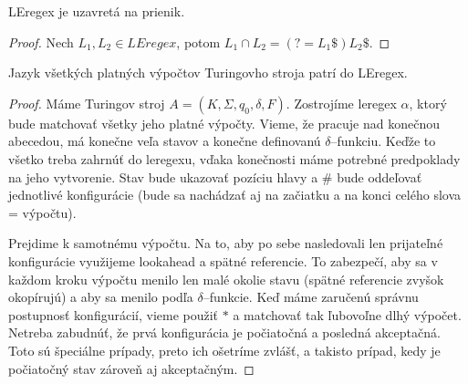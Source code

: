 \begin{veta}
LEregex je uzavretá na prienik.
\end{veta}
\begin{proof}
Nech $L_1,L_2 \in LEregex$, potom $L_1 \cap L_2 = \left( ?= L_1 \mathdollar \right) L_2 \mathdollar $.
\end{proof}

\begin{veta}
Jazyk všetkých platných výpočtov Turingovho stroja patrí do LEregex.
\end{veta}
\begin{proof}
Máme Turingov stroj $A = (K,\Sigma ,q_0,\delta ,F)$. Zostrojíme leregex $\alpha$, ktorý bude matchovať všetky jeho platné výpočty. Vieme, že pracuje nad konečnou abecedou, má konečne veľa stavov a konečne definovanú $\delta$--funkciu. Keďže to všetko treba zahrnúť do leregexu, vďaka konečnosti máme potrebné predpoklady na jeho vytvorenie. Stav bude ukazovať pozíciu hlavy a $\#$ bude oddeľovať jednotlivé konfigurácie (bude sa nachádzať aj na začiatku a na konci celého slova = výpočtu).

Prejdime k samotnému výpočtu. Na to, aby po sebe nasledovali len prijateľné konfigurácie využijeme lookahead a spätné referencie. To zabezpečí, aby sa v každom kroku výpočtu menilo len malé okolie stavu (spätné referencie zvyšok okopírujú) a aby sa menilo podľa $\delta$--funkcie. Keď máme zaručenú správnu postupnosť konfigurácií, vieme použiť $*$ a matchovať tak ľubovoľne dlhý výpočet. Netreba zabudnúť, že prvá konfigurácia je počiatočná a posledná akceptačná. Toto sú špeciálne prípady, preto ich ošetríme zvlášť, a takisto prípad, kedy je počiatočný stav zároveň aj akceptačným.


\end{proof}
